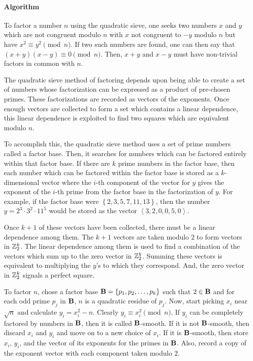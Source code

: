 \documentclass[12pt]{article}
\newcommand{\B}{\ensuremath\mathbf{B}}
\newcommand{\Z}{\ensuremath\mathbb{Z}}
\begin{document}
\paragraph{Algorithm}

    To factor a number $n$ using the quadratic sieve, one seeks
    two numbers $x$ and $y$ which are not congruent modulo $n$
    with $x$ not congruent to $-y$ modulo $n$ but
    have $x^2 \equiv y^2 \pmod n$.  If two such numbers are found,
    one can then say that $(x+y)(x-y) \equiv 0 \pmod n$.  Then,
    $x+y$ and $x-y$ must have non-trivial factors in common with $n$.

    The quadratic sieve method of factoring depends upon being able
    to create a set of numbers whose factorization can be expressed
    as a product of pre-chosen primes.  These factorizations are
    recorded as vectors of the exponents.  Once enough vectors are
    collected to form a set which contains a linear dependence,
    this linear dependence is exploited to find two squares which
    are equivalent modulo $n$.

    To accomplish this, the quadratic sieve method uses a set of
    prime numbers called a factor base.  Then, it searches for
    numbers which can be factored entirely within that factor base.
    If there are $k$ prime numbers in the factor base, then each
    number which can be factored within the factor base is stored
    as a $k$-dimensional vector where the $i$-th component of the
    vector for $y$ gives the exponent of the $i$-th prime from the
    factor base in the factorization of $y$.  For example, if the
    factor base were $\left\{ 2, 3, 5, 7, 11, 13 \right\}$, then
    the number $y = 2^3\cdot3^2\cdot11^5$ would be stored as the
    vector $\left< 3,2,0,0,5,0 \right>$.

    Once $k+1$ of these vectors have been collected, there must be
    a linear dependence among them.  The $k+1$ vectors are taken
    modulo $2$ to form vectors in $\Z_2^k$.  The linear dependence
    among them is used to find a combination of the vectors which
    sum up to the zero vector in $\Z_2^k$.  Summing these vectors
    is equivalent to multiplying the $y$'s to which they correspond.
    And, the zero vector in $\Z_2^k$ signals a perfect square.

    To factor $n$, chose a factor base $\B = \left\{ p_1, p_2,
    \ldots, p_k \right\}$ such that $2 \in \B$ and for each odd
    prime $p_j$ in $\B$, $n$ is a quadratic residue of $p_j$.  Now,
    start picking $x_i$ near $\sqrt{n}$ and calculate $y_i = x_i^2
    - n$.  Clearly $y_i \equiv x_i^2 \pmod n$.  If $y_i$ can be
    completely factored by numbers in $\B$, then it is called
    $\B$-smooth.  If it is not $\B$-smooth, then discard $x_i$ and
    $y_i$ and move on to a new choice of $x_i$.  If it is $\B$-smooth,
    then store $x_i$, $y_i$, and the vector of its exponents for
    the primes in $\B$.  Also, record a copy of the exponent vector
    with each component taken modulo $2$.
\end{document}
